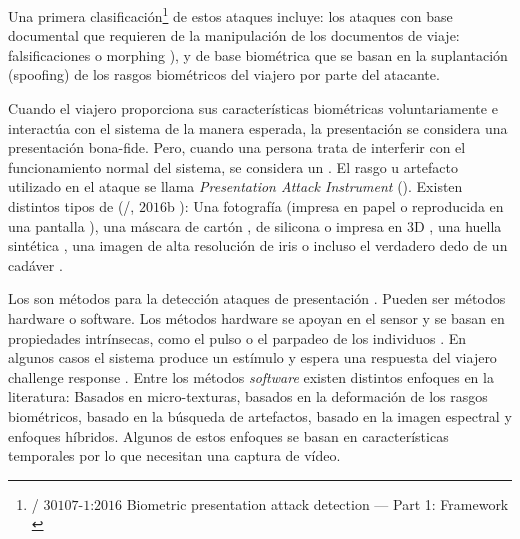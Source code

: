 Una primera clasificación\footnote{/ $30107$-$1$:$2016$ Biometric presentation attack detection — Part 1: Framework  \cite{ISO/PADFramework}} de estos ataques incluye: los ataques con base documental que requieren de la manipulación de los documentos de viaje: falsificaciones \cite{tolosana2019presentation} o \gls{morphing}  \cite{scherhag2018towards}), y de base biométrica que se basan en la suplantación (\gls{spoofing}) de los rasgos biométricos del viajero por parte del atacante.

Cuando el viajero proporciona sus características biométricas voluntariamente e interactúa con el sistema de la manera esperada, la presentación  se considera una presentación \gls{bona-fide}. Pero, cuando una persona trata de interferir con el funcionamiento normal del sistema, se considera un . El rasgo u artefacto utilizado en el ataque se llama \textit{Presentation Attack Instrument} (). Existen distintos tipos de  (/, $2016$b \cite{ISO/PADFramework}): Una fotografía (impresa en papel \cite{scherhag2017vulnerability} \cite{rigas2015eye} \cite{anjos2011counter} o reproducida en una pantalla \cite{li2016generalized}), una máscara de cartón \cite{del2017face}, de silicona \cite{bhattacharjee2018spoofing} \cite{manjani2017detecting} o impresa en $3$D \cite{agarwal2017face}, una huella sintética \cite{sousedik2014presentation}, una imagen de alta resolución de iris \cite{raja2016color} o incluso el verdadero dedo de un cadáver \cite{deadFinger}.

Los  son métodos para la detección ataques de presentación \cite{marcel2014handbook}. Pueden ser métodos hardware o software.
Los métodos hardware se apoyan en el sensor y se basan en propiedades intrínsecas, como el pulso o el parpadeo de los individuos \cite{rigas2015eye}. En algunos casos el sistema produce un estímulo y espera una respuesta del viajero {\gls{challenge response}} \cite{shoukry2015pycra}.
Entre los métodos \textit{software} existen distintos enfoques en la literatura: Basados en micro-texturas, basados en la deformación de  los rasgos biométricos, basado en la búsqueda de artefactos, basado en la imagen espectral y enfoques híbridos.
Algunos de estos enfoques se basan en características temporales por lo que necesitan una captura de vídeo. 


